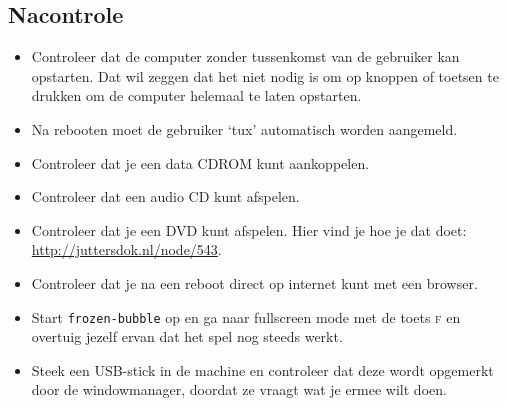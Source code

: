 \subsection{Nacontrole}
\begin{itemize}
	\item Controleer dat de computer zonder tussenkomst van de gebruiker kan opstarten. Dat wil zeggen dat het niet nodig is om op knoppen of toetsen te drukken om de computer helemaal te laten opstarten.
	\item Na rebooten moet de gebruiker `tux' automatisch worden aangemeld.
	\item Controleer dat je een data CDROM kunt aankoppelen.
  \item Controleer dat een audio CD kunt afspelen.
  \item Controleer dat je een DVD kunt afspelen. Hier vind je hoe je dat doet:\\ \url{http://juttersdok.nl/node/543}.
	\item Controleer dat je na een reboot direct op internet kunt met een browser.
	\item Start \texttt{frozen-bubble} op en ga naar fullscreen mode met de toets \textsc{f} en overtuig jezelf ervan dat het spel nog steeds werkt.
  \item Steek een USB-stick in de machine en controleer dat deze wordt opgemerkt door de windowmanager, doordat ze vraagt wat je ermee wilt doen.
\end{itemize}
